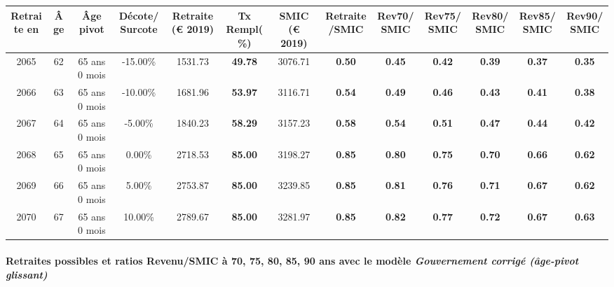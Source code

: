 { \scriptsize \begin{center} 
\begin{tabular}[htb]{|c|c||c|c||c|c||c||c|c|c|c|c|c|} 
\hline 
 Retraite en &  Âge &  Âge pivot &  Décote/Surcote &  Retraite (\euro{} 2019) &  Tx Rempl(\%) &  SMIC (\euro{} 2019) &  Retraite/SMIC &  Rev70/SMIC &  Rev75/SMIC &  Rev80/SMIC &  Rev85/SMIC &  Rev90/SMIC \\ 
\hline \hline 
 2065 &  62 &  65 ans 0 mois &  -15.00\% &  1531.73 &  {\bf 49.78} &  3076.71 &  {\bf {\color{red} 0.50}} &  {\bf {\color{red} 0.45}} &  {\bf {\color{red} 0.42}} &  {\bf {\color{red} 0.39}} &  {\bf {\color{red} 0.37}} &  {\bf {\color{red} 0.35}} \\ 
\hline 
 2066 &  63 &  65 ans 0 mois &  -10.00\% &  1681.96 &  {\bf 53.97} &  3116.71 &  {\bf {\color{red} 0.54}} &  {\bf {\color{red} 0.49}} &  {\bf {\color{red} 0.46}} &  {\bf {\color{red} 0.43}} &  {\bf {\color{red} 0.41}} &  {\bf {\color{red} 0.38}} \\ 
\hline 
 2067 &  64 &  65 ans 0 mois &  -5.00\% &  1840.23 &  {\bf 58.29} &  3157.23 &  {\bf {\color{red} 0.58}} &  {\bf {\color{red} 0.54}} &  {\bf {\color{red} 0.51}} &  {\bf {\color{red} 0.47}} &  {\bf {\color{red} 0.44}} &  {\bf {\color{red} 0.42}} \\ 
\hline 
 2068 &  65 &  65 ans 0 mois &  0.00\% &  2718.53 &  {\bf 85.00} &  3198.27 &  {\bf {\color{red} 0.85}} &  {\bf {\color{red} 0.80}} &  {\bf {\color{red} 0.75}} &  {\bf {\color{red} 0.70}} &  {\bf {\color{red} 0.66}} &  {\bf {\color{red} 0.62}} \\ 
\hline 
 2069 &  66 &  65 ans 0 mois &  5.00\% &  2753.87 &  {\bf 85.00} &  3239.85 &  {\bf {\color{red} 0.85}} &  {\bf {\color{red} 0.81}} &  {\bf {\color{red} 0.76}} &  {\bf {\color{red} 0.71}} &  {\bf {\color{red} 0.67}} &  {\bf {\color{red} 0.62}} \\ 
\hline 
 2070 &  67 &  65 ans 0 mois &  10.00\% &  2789.67 &  {\bf 85.00} &  3281.97 &  {\bf {\color{red} 0.85}} &  {\bf {\color{red} 0.82}} &  {\bf {\color{red} 0.77}} &  {\bf {\color{red} 0.72}} &  {\bf {\color{red} 0.67}} &  {\bf {\color{red} 0.63}} \\ 
\hline 
\hline 
\end{tabular} 
\end{center} } 
\paragraph{Retraites possibles et ratios Revenu/SMIC à 70, 75, 80, 85, 90 ans avec le modèle \emph{Gouvernement corrigé (âge-pivot glissant)}}  
 

